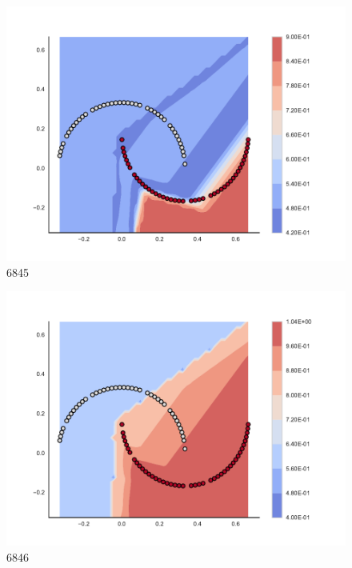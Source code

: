 \begin{subfigure}[b]{0.09\textwidth}
    \includegraphics[clip, trim=2.35cm 1.75cm 4.5cm 0cm,width=\textwidth]{img/convergence/6845.pdf}
    \caption{6845}
    \label{fig:convergence_6845}
\end{subfigure}
%
\begin{subfigure}[b]{0.09\textwidth}
    \includegraphics[clip, trim=2.35cm 1.75cm 4.5cm 0cm,width=\textwidth]{img/convergence/6846.pdf}
    \caption{6846}
    \label{fig:convergence_6846}
\end{subfigure}
%
